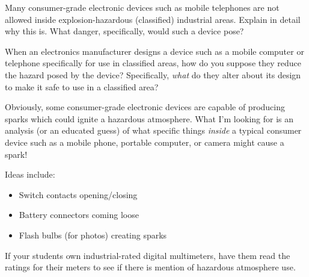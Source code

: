 

Many consumer-grade electronic devices such as mobile telephones are not allowed inside explosion-hazardous (classified) industrial areas.  Explain in detail why this is.  What danger, specifically, would such a device pose?

\vskip 10pt

When an electronics manufacturer designs a device such as a mobile computer or telephone specifically for use in classified areas, how do you suppose they reduce the hazard posed by the device?  Specifically, {\it what} do they alter about its design to make it safe to use in a classified area?







Obviously, some consumer-grade electronic devices are capable of producing sparks which could ignite a hazardous atmosphere.  What I'm looking for is an analysis (or an educated guess) of what specific things {\it inside} a typical consumer device such as a mobile phone, portable computer, or camera might cause a spark!







Ideas include:

\begin{itemize}
\item{} Switch contacts opening/closing
\item{} Battery connectors coming loose
\item{} Flash bulbs (for photos) creating sparks
\end{itemize}

If your students own industrial-rated digital multimeters, have them read the ratings for their meters to see if there is mention of hazardous atmosphere use.




